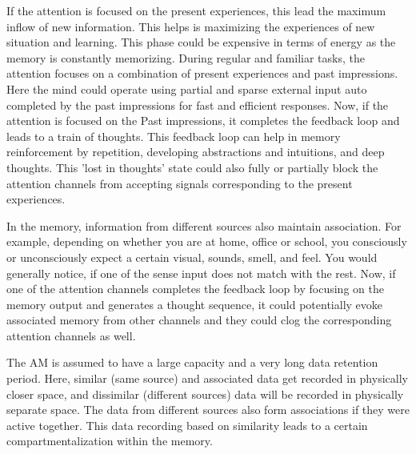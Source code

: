 \documentclass[reprint,amsmath,amssymb,apr,aip,onecolumn, 11pt]{revtex4-1}
\begin{document}
		 
		 If the attention is focused on the present experiences, this lead the maximum inflow of new information. This helps is maximizing the experiences of new situation and learning. This phase could be expensive in terms of energy as the memory is constantly memorizing. During regular and familiar tasks, the attention focuses on a  combination of present experiences and past impressions. Here the mind could operate using partial and sparse external input auto completed by the past impressions for fast and efficient responses. Now, if the attention is focused on the Past impressions, it completes the feedback loop and leads to a train of thoughts. This feedback loop can help in memory reinforcement by repetition, developing abstractions and intuitions, and deep thoughts. This 'lost in thoughts' state could also fully or partially block the attention channels from accepting signals corresponding to the present experiences.    

		
		In the memory, information from different sources also maintain association. For example, depending on whether you are at home, office or school, you consciously or unconsciously expect a certain visual, sounds, smell, and feel. You would generally notice, if one of the sense input does not match with the rest. Now, if one of the attention channels completes the feedback loop by focusing on the memory output and generates a thought sequence, it could potentially evoke associated memory from other channels and they could  clog the corresponding attention channels as well. 
		
		  The AM is assumed to have a large capacity and a very long data retention period. Here, similar (same source) and associated data get recorded in physically closer space, and dissimilar (different sources) data will be recorded in physically separate space. The data from different sources also form associations if they were active together. This data recording based on similarity leads to a certain compartmentalization within the memory.
		
		
		 
	
\end{document}
